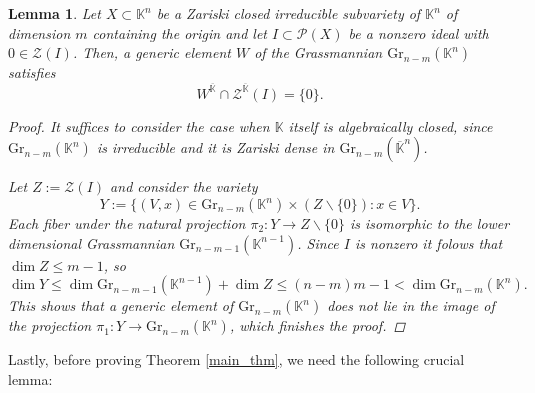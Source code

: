 \documentclass{amsart}
\theoremstyle{plain}
\newtheorem{lem}[thm]{Lemma}
\theoremstyle{definition}
\theoremstyle{remark}
\numberwithin{equation}{section}
\newcommand{\K}{\mathbb{K}}
\newcommand{\PP}{\mathcal{P}}
\newcommand{\Z}{\mathcal{Z}}
\begin{document}
\begin{lem}\label{generic}
Let $X\subset \K^n$ be a Zariski closed irreducible subvariety of $\K^n$ of dimension $m$ containing the origin and let $I\subset \PP(X)$ be a nonzero ideal with $0\in\Z(I)$. Then, a generic element $W$ of the Grassmannian $\mathrm{Gr}_{n-m}(\K^n)$ satisfies
\begin{equation*}
   W^{\overline{\K}}\cap \Z^{\overline{\K}}(I)=\{0\}.  
\end{equation*}
\begin{proof}
It suffices to consider the case when $\K$ itself is algebraically closed, since $\mathrm{Gr}_{n-m}(\K^n)$ is irreducible and it is Zariski dense in $\mathrm{Gr}_{n-m}(\overline{\K}^n)$. 

 

Let $Z:=\Z(I)$ and consider the variety
\begin{equation*}
    Y:=\{(V,x)\in\mathrm{Gr}_{n-m}(\K^n)\times (Z\backslash \{0\}):x\in V\}. 
\end{equation*}
Each fiber under the natural projection $\pi_2:Y\rightarrow Z\backslash \{0\}$ is isomorphic to the lower dimensional Grassmannian $\mathrm{Gr}_{n-m-1}(\K^{n-1})$. Since $I$ is nonzero it folows that $\dim Z\leq m-1$, so 
\begin{equation*}
    \dim Y\leq \dim \mathrm{Gr}_{n-m-1}(\K^{n-1})+\dim Z\leq(n-m)m-1<\dim \mathrm{Gr}_{n-m}(\K^n).
\end{equation*}
This shows that a generic element of $\mathrm{Gr}_{n-m}(\K^n)$ does not lie in the image of the projection $\pi_1:Y\rightarrow \mathrm{Gr}_{n-m}(\K^n)$, which finishes the proof.
\end{proof}
\end{lem}

Lastly, before proving Theorem \ref{main_thm}, we need the following crucial lemma:
\end{document}

